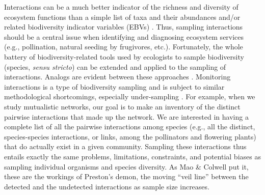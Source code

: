 \documentclass[12pt]{article}
\begin{document}
Interactions can be a much better indicator of the richness and diversity of ecosystem functions than a simple list of taxa and their abundances and\slash or related biodiversity indicator variables (EBVs) \citep{Memmott:2006vy,ValienteBanuet:2014bw}. Thus, sampling interactions should be a central issue when identifying and diagnosing ecosystem services (e.g., pollination, natural seeding by frugivores, etc.). Fortunately, the whole battery of biodiversity-related tools used by ecologists to sample biodiversity (species, \emph{sensu stricto}) can be extended and applied to the sampling of interactions. Analogs are evident between these approaches \citep[see Table 2 in][]{Colwell:2004fi}. Monitoring interactions is a type of biodiversity sampling and is subject to similar methodological shortcomings, especially under-sampling \citep{E31/2562,Jordano:2009c,Coddington:2009fi,Vazquez:2009p82,Dorado:2011cf,RiveraHutinel:2012vn}. For example, when we study mutualistic networks, our goal is to make an inventory of the distinct pairwise interactions that made up the network. We are interested in having a complete list of all the pairwise interactions among species (e.g., all the distinct, species-species interactions, or links, among the pollinators and flowering plants) that do actually exist in a given community. Sampling these interactions thus entails exactly the same problems, limitations, constraints, and potential biases as sampling individual organisms and species diversity. As Mao \& Colwell \citeyearpar{Mao:2005tka} put it, these are the workings of Preston’s demon, the moving ``veil line'' \citep{E2/813} between the detected and the undetected interactions as sample size increases.
\end{document}
